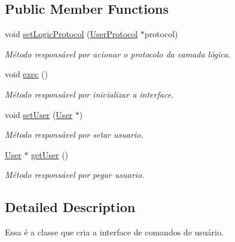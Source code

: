 \subsection*{Public Member Functions}
\begin{DoxyCompactItemize}
\item 
void \hyperlink{class_user_controler_a796395d8c5cbed232634e43748c64f66}{set\-Logic\-Protocol} (\hyperlink{class_user_protocol}{User\-Protocol} $\ast$protocol)
\begin{DoxyCompactList}\small\item\em Método responsável por acionar o protocolo da camada lógica. \end{DoxyCompactList}\item 
\hypertarget{class_user_controler_a8d8c6485478ad73ed061f19446b3be68}{void \hyperlink{class_user_controler_a8d8c6485478ad73ed061f19446b3be68}{exec} ()}\label{class_user_controler_a8d8c6485478ad73ed061f19446b3be68}

\begin{DoxyCompactList}\small\item\em Método responsável por inicializar a interface. \end{DoxyCompactList}\item 
\hypertarget{class_user_controler_ae608d46a04a388d54f965dd5abdf61eb}{void \hyperlink{class_user_controler_ae608d46a04a388d54f965dd5abdf61eb}{set\-User} (\hyperlink{class_user}{User} $\ast$)}\label{class_user_controler_ae608d46a04a388d54f965dd5abdf61eb}

\begin{DoxyCompactList}\small\item\em Método responsável por setar usuario. \end{DoxyCompactList}\item 
\hypertarget{class_user_controler_a414de6a522b2042e62cbcbba265e1f90}{\hyperlink{class_user}{User} $\ast$ \hyperlink{class_user_controler_a414de6a522b2042e62cbcbba265e1f90}{get\-User} ()}\label{class_user_controler_a414de6a522b2042e62cbcbba265e1f90}

\begin{DoxyCompactList}\small\item\em Método responsável por pegar usuario. \end{DoxyCompactList}\end{DoxyCompactItemize}


\subsection{Detailed Description}
Essa é a classe que cria a interface de comandos de usuário. 

